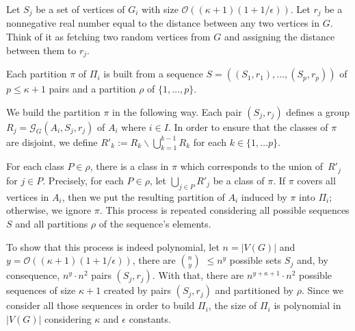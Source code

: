 Let \(S_j\) be a set of vertices of \(G_i\) with size \(\mathcal{O}((\kappa + 1)(1 + 1/\epsilon))\). Let \(r_j\) be a nonnegative real number equal to the distance between any two vertices in \(G\). Think of it as fetching two random vertices from \(G\) and assigning the distance between them to \(r_j\).

Each partition \(\pi\) of \(\Pi_i\) is built from a sequence \(S = ((S_1, r_1), \dots, (S_p, r_p))\) of \(p \le \kappa + 1\) pairs and a partition \(\rho\) of \(\{1, \dots, p\}\).

We build the partition \(\pi\) in the following way. Each pair \((S_j, r_j)\) defines a group \(R_j = \mathcal{G}_G(A_i, S_j, r_j)\) of \(A_i\) where \(i\in I\). In order to ensure that the classes of \(\pi\) are disjoint, we define \(R'_k := R_k \backslash \bigcup^{k-1}_{k=1} R_k\) for each $k \in \{1, \ldots p\}$.

For each class \(P \in \rho\), there is a class in \(\pi\) which corresponds to the union of~\(R'_j\) for \(j \in P\). Precisely, for each \(P \in \rho\),  let \(\bigcup_{j \in P} R'_j\) be a class of \(\pi\). If \(\pi\) covers all vertices in \(A_i\), then we put the resulting partition of \(A_i\) induced by \(\pi\) into \(\Pi_i\); otherwise, we ignore \(\pi\). This process is repeated considering all possible sequences \(S\) and all partitions \(\rho\) of the sequence's elements.

To show that this process is indeed polynomial, let \(n = |V(G)|\) and \(y = \mathcal{O}((\kappa + 1)(1 + 1/\epsilon))\), there are \(n \choose y \) \(\leq n^y\) possible sets \(S_j\) and, by consequence, \(n^y \cdot n^2\) pairs \((S_j, r_j)\). With that, there are \(n^{y + \kappa + 1} \cdot n^2\) possible sequences of size \(\kappa + 1\) created by pairs \((S_j, r_j)\) and partitioned by \(\rho\). Since we consider all those sequences in order to build \(\Pi_i\), the size of \(\Pi_i\) is polynomial in \(|V(G)|\) considering \(\kappa\) and \(\epsilon\) constants.

